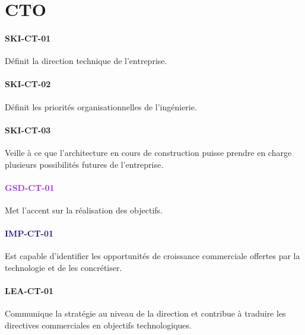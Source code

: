 \documentclass[a4paper, french, openany, 12pt]{book}
\newcommand\dex[1]{\textcolor{BrickRed}{\textbf{\uppercase{ski-{#1}}}}}
\newcommand\str[1]{\textcolor{DarkOrchid}{\textbf{\uppercase{gsd-{#1}}}}}
\newcommand\wis[1]{\textcolor{MidnightBlue}{\textbf{\uppercase{imp-{#1}}}}}
\newcommand\cha[1]{\textcolor{OliveGreen}{\textbf{\uppercase{lea-{#1}}}}}
\begin{document}
\chapter{CTO}

\begin{multicols}{2}

  \subsubsection*{\dex{ct-01}}

  Définit la direction technique de l'entreprise.

  \subsubsection*{\dex{ct-02}}

  Définit les priorités organisationnelles de l'ingénierie.

  \subsubsection*{\dex{ct-03}}

  Veille à ce que l'architecture en cours de construction puisse prendre en charge plusieurs possibilités futures de 
  l'entreprise.

  \subsubsection*{\str{ct-01}}

  Met l'accent sur la réalisation des objectifs.

  \subsubsection*{\wis{ct-01}}

  Est capable d'identifier les opportunités de croissance commerciale offertes par la technologie et de les concrétiser.

  \subsubsection*{\cha{ct-01}}

  Communique la stratégie au niveau de la direction et contribue à traduire les directives commerciales en objectifs 
  technologiques.

\end{multicols}
\end{document}
